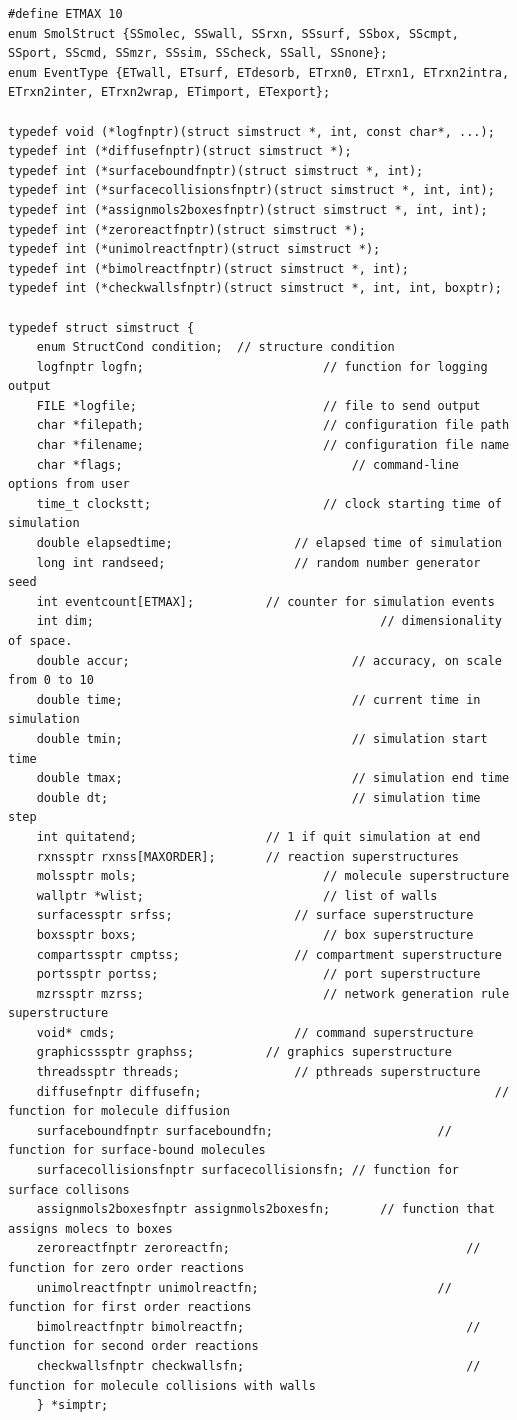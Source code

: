 \documentclass {scrbook}
\begin{document}
\begin{lstlisting}
#define ETMAX 10
enum SmolStruct {SSmolec, SSwall, SSrxn, SSsurf, SSbox, SScmpt, SSport, SScmd, SSmzr, SSsim, SScheck, SSall, SSnone};
enum EventType {ETwall, ETsurf, ETdesorb, ETrxn0, ETrxn1, ETrxn2intra, ETrxn2inter, ETrxn2wrap, ETimport, ETexport};

typedef void (*logfnptr)(struct simstruct *, int, const char*, ...);
typedef int (*diffusefnptr)(struct simstruct *);
typedef int (*surfaceboundfnptr)(struct simstruct *, int);
typedef int (*surfacecollisionsfnptr)(struct simstruct *, int, int);
typedef int (*assignmols2boxesfnptr)(struct simstruct *, int, int);
typedef int (*zeroreactfnptr)(struct simstruct *);
typedef int (*unimolreactfnptr)(struct simstruct *);
typedef int (*bimolreactfnptr)(struct simstruct *, int);
typedef int (*checkwallsfnptr)(struct simstruct *, int, int, boxptr);

typedef struct simstruct {
	enum StructCond condition;	// structure condition
	logfnptr logfn;							// function for logging output
	FILE *logfile;							// file to send output
	char *filepath;							// configuration file path
	char *filename;							// configuration file name
	char *flags;								// command-line options from user
	time_t clockstt;						// clock starting time of simulation
	double elapsedtime;					// elapsed time of simulation
	long int randseed;					// random number generator seed
	int eventcount[ETMAX];			// counter for simulation events
	int dim;										// dimensionality of space.
	double accur;								// accuracy, on scale from 0 to 10
	double time;								// current time in simulation
	double tmin;								// simulation start time
	double tmax;								// simulation end time
	double dt;									// simulation time step
	int quitatend;					// 1 if quit simulation at end
	rxnssptr rxnss[MAXORDER];		// reaction superstructures
	molssptr mols;							// molecule superstructure
	wallptr *wlist;							// list of walls
	surfacessptr srfss;					// surface superstructure
	boxssptr boxs;							// box superstructure
	compartssptr cmptss;				// compartment superstructure
	portssptr portss;						// port superstructure
	mzrssptr mzrss;							// network generation rule superstructure
	void* cmds;							// command superstructure
	graphicsssptr graphss;			// graphics superstructure
	threadssptr threads;				// pthreads superstructure
	diffusefnptr diffusefn;											// function for molecule diffusion
	surfaceboundfnptr surfaceboundfn;						// function for surface-bound molecules
	surfacecollisionsfnptr surfacecollisionsfn; // function for surface collisons
	assignmols2boxesfnptr assignmols2boxesfn;		// function that assigns molecs to boxes
	zeroreactfnptr zeroreactfn;									// function for zero order reactions
	unimolreactfnptr unimolreactfn;							// function for first order reactions
	bimolreactfnptr bimolreactfn;								// function for second order reactions
	checkwallsfnptr checkwallsfn;								// function for molecule collisions with walls
	} *simptr;
\end{lstlisting}
\end{document}
